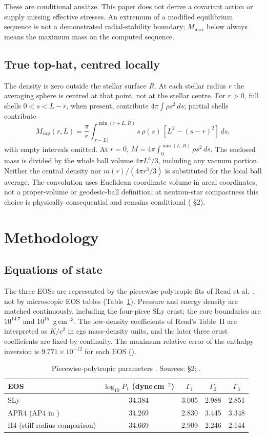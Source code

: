 \documentclass[11pt,a4paper]{article}
\newcommand{\ee}[2]{#1\times10^{#2}}
\begin{document}
These are conditional ans\"atze. This paper does not derive a covariant action or supply missing effective
stresses. An extremum of a modified equilibrium sequence is not a demonstrated radial-stability boundary;
$M_{\max}$ below always means the maximum mass on the computed sequence.

\subsection{True top-hat, centred locally}
The density is zero outside the stellar surface $R$. At each stellar radius $r$ the averaging sphere is
centred at that point, not at the stellar centre. For $r>0$, full shells $0<s<L-r$, when present, contribute
$4\pi\int\rho s^2\,ds$; partial shells contribute
\begin{equation}
M_{\mathrm{cap}}(r,L)=\frac{\pi}{r}\int_{|r-L|}^{\min(r+L,R)}s\,\rho(s)\,[L^2-(s-r)^2]\,ds,
\end{equation}
with empty intervals omitted. At $r=0$, $M=4\pi\int_0^{\min(L,R)}\rho s^2\,ds$. The enclosed mass is divided
by the whole ball volume $4\pi L^3/3$, including any vacuum portion. Neither the central density nor
$m(r)/(4\pi r^3/3)$ is substituted for the local ball average. The convolution uses Euclidean coordinate
volume in areal coordinates, not a proper-volume or geodesic-ball definition; at neutron-star compactness
this choice is physically consequential and remains conditional ( \S2).

\section{Methodology}
\subsection{Equations of state}
The three EOSs are represented by the piecewise-polytropic fits of Read et al.\ \cite{read}, not by microscopic EOS
tables (Table~\ref{tab:eos}). Pressure and energy density are matched continuously, including the four-piece
SLy crust; the core boundaries are $10^{14.7}$ and $10^{15}$~g\,cm$^{-3}$. The low-density coefficients of
Read's Table~II are interpreted as $K/c^2$ in cgs mass-density units, and the later three crust coefficients
are fixed by continuity. The maximum relative error of the enthalpy inversion is $\ee{9.771}{-12}$ for each
EOS ().

\begin{table}[t]
\centering
\caption[]{Piecewise-polytropic parameters \cite{read}. Sources:  \S2; .}
\label{tab:eos}
\begin{tabular}{lcccc}
\toprule
EOS & $\log_{10}P_1$ (dyne\,cm$^{-2}$) & $\Gamma_1$ & $\Gamma_2$ & $\Gamma_3$\\
\midrule
SLy & 34.384 & 3.005 & 2.988 & 2.851\\
APR4 (AP4 in \cite{read}) & 34.269 & 2.830 & 3.445 & 3.348\\
H4 (stiff-radius comparison) & 34.669 & 2.909 & 2.246 & 2.144\\
\bottomrule
\end{tabular}
\end{table}
\end{document}
